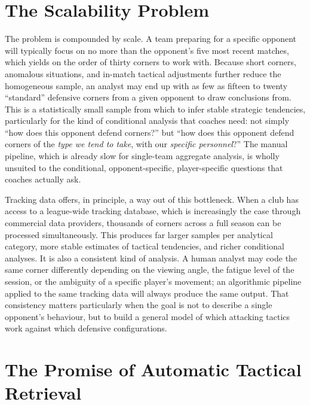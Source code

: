 \section{The Scalability Problem}
\label{sec:prob_scalability}

The problem is compounded by scale. A team preparing for a specific opponent
will typically focus on no more than the opponent's five most recent matches,
which yields on the order of thirty corners to work with.%
Because short corners, anomalous situations, and in-match tactical adjustments
further reduce the homogeneous sample, an analyst may end up with as few as
fifteen to twenty ``standard'' defensive corners from a given opponent to draw
conclusions from.
This is a statistically small sample from which to infer stable strategic
tendencies, particularly for the kind of conditional analysis that coaches need:
not simply ``how does this opponent defend corners?'' but ``how does this
opponent defend corners of the \emph{type we tend to take}, with our
\emph{specific personnel}?'' The manual pipeline, which is already slow for
single-team aggregate analysis, is wholly unsuited to the conditional,
opponent-specific, player-specific questions that coaches actually ask.

Tracking data offers, in principle, a way out of this bottleneck. When a club
has access to a league-wide tracking database, which is increasingly the case
through commercial data providers, thousands of corners across a full season
can be processed simultaneously. This produces far larger samples per
analytical category, more stable estimates of tactical tendencies, and richer
conditional analyses. It is also a consistent kind of analysis. A human analyst
may code the same corner differently depending on the viewing angle, the
fatigue level of the session, or the ambiguity of a specific player's
movement; an algorithmic pipeline applied to the same tracking data will
always produce the same output. That consistency matters particularly when
the goal is not to describe a single opponent's behaviour, but to build a
general model of which attacking tactics work against which defensive
configurations.

\section{The Promise of Automatic Tactical Retrieval}
\label{sec:prob_automatic}

